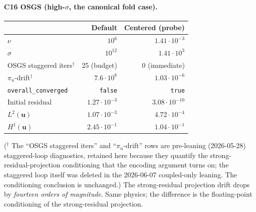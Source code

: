 \documentclass[11pt]{article}
\begin{document}
\paragraph{C16 OSGS (high-$\sigma$, the canonical fold case).}
\begin{center}
\begin{tabular}{lrr}
  \toprule
  & Default & Centered (probe) \\
  \midrule
  $\nu$                           & $10^{6}$            & $1.41\cdot10^{-3}$ \\
  $\sigma$                        & $10^{12}$           & $1.41\cdot10^{3}$ \\
  OSGS staggered iters$^{\dagger}$            & 25 (budget)         & 0 (immediate) \\
  $\pi_u$-drift$^{\dagger}$                   & $7.6\cdot10^{8}$    & $1.03\cdot10^{-6}$ \\
  \texttt{overall\_converged}     & \texttt{false}      & \texttt{true} \\
  Initial residual                & $1.27\cdot10^{-3}$  & $3.08\cdot10^{-10}$ \\
  $L^{2}(\boldsymbol{u})$         & $1.07\cdot10^{-3}$  & $4.72\cdot10^{-4}$ \\
  $H^{1}(\boldsymbol{u})$         & $2.45\cdot10^{-1}$  & $1.04\cdot10^{-1}$ \\
  \bottomrule
\end{tabular}
\end{center}
\noindent ($^{\dagger}$ The ``OSGS staggered iters'' and ``$\pi_u$-drift''
rows are pre-leaning (2026-05-28) staggered-loop diagnostics, retained here
because they quantify the strong-residual-projection conditioning that the
encoding argument turns on; the staggered loop itself was deleted in the
2026-06-07 coupled-only leaning. The conditioning conclusion is unchanged.)
The strong-residual projection drift drops by
\emph{fourteen orders of magnitude}. Same physics; the difference is the
floating-point conditioning of the strong-residual projection.
\end{document}
